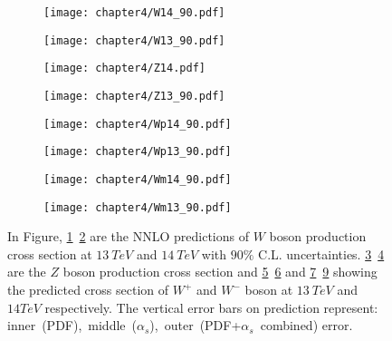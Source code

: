 \documentclass[a4paper,12pt]{report}
\numberwithin{equation}{section}
\begin{document}
\begin{figure}[H]
\centering
\begin{subfigure}{0.49\textwidth}
\texttt{[image: chapter4/W14\_90.pdf]}
\vspace*{-8mm}
\caption{}
\label{w14_90}
\end{subfigure}
\begin{subfigure}{0.49\textwidth}
\texttt{[image: chapter4/W13\_90.pdf]}
\vspace*{-8mm}
\caption{}
\label{w13_90}
\end{subfigure}
\begin{subfigure}{0.49\textwidth}
\texttt{[image: chapter4/Z14.pdf]}
\vspace*{-8mm}
\caption{}
\label{z14_90}
\end{subfigure}
\begin{subfigure}{0.49\textwidth}
\texttt{[image: chapter4/Z13\_90.pdf]}
\vspace*{-8mm}
\caption{}
\label{z13_90}
\end{subfigure}
\begin{subfigure}{0.49\textwidth}
\texttt{[image: chapter4/Wp14\_90.pdf]}
\vspace*{-8mm}
\caption{}
\label{wp14_90}
\end{subfigure}
\begin{subfigure}{0.49\textwidth}
\texttt{[image: chapter4/Wp13\_90.pdf]}
\vspace*{-8mm}
\caption{}
\label{wp13_90}
\end{subfigure}
\begin{subfigure}{0.49\textwidth}
\texttt{[image: chapter4/Wm14\_90.pdf]}
\vspace*{-8mm}
\caption{}
\label{wm14_90}
\end{subfigure}
\begin{subfigure}{0.49\textwidth}
\texttt{[image: chapter4/Wm13\_90.pdf]}
\vspace*{-8mm}
\caption{}
\label{wm13_90}
\end{subfigure}
\caption{In Figure, \ref{w14_90}~\ref{w13_90} are the NNLO predictions of $W$ boson production cross section at $13~TeV$ and $14~TeV$ with $90\%$ C.L. uncertainties. \ref{z14_90}~\ref{z13_90} are the $Z$ boson production cross section and \ref{wp14_90}~\ref{wp13_90} and \ref{wm14_90}~\ref{wm13_90} showing the predicted cross section of $W^{+}$ and $W^{-}$ boson at $13~TeV$ and $14TeV$ respectively. The vertical error bars on prediction represent: inner~(PDF),~middle~($\alpha_{s}$),~outer~(PDF+$\alpha_{s}$~combined) error.} 
\end{figure}
\end{document}
